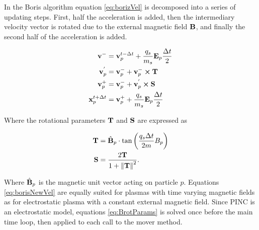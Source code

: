 In the Boris algorithm equation \eqref{eq:borizVel} is decomposed into a series of updating steps. First, half the acceleration is added, then the intermediary velocity vector is rotated due to the external magnetic field $\vb{B}$, and finally the second half of the acceleration is added.

\begin{subequations}\label{eq:borisNewVel}
    \begin{align}
        \vb{v}^{-} &= \vb{v}^{t-\Delta t}_p + \frac{q_s}{m_s} \vb{E}_p \frac{\Delta t}{2} \\
        \vb{v}^{'}_p &= \vb{v}^{-}_p + \vb{v}^{-}_p \cross \vb{T} \\
        \vb{v}^{+}_p &= \vb{v}^{-}_p + \vb{v}^{'}_p \cross \vb{S} \\
        \vb{x}^{t+\Delta t}_p &= \vb{v}^{+}_p + \frac{q_s}{m_s} \vb{E}_p \frac{\Delta t}{2} 
    \end{align}
\end{subequations}

Where the rotational parameters $\vb{T}$ and $\vb{S}$ are expressed as

\begin{subequations}\label{eq:BrotParams}
    \begin{align}
        \vb{T} &= \hat{\vb{B}}_p \cdot \tan\left(\frac{q_s \Delta t}{2m} B_p \right) \\
        \vb{S} &= \frac{2 \vb{T}}{1 + \norm{\vb{T}}^2}. 
    \end{align}
\end{subequations}

Where $\hat{\vb{B}}_p$ is the magnetic unit vector acting on particle $p$. Equations \eqref{eq:borisNewVel} are equally suited for plasmas with time varying magnetic fields as for electrostatic plasma with a constant external magnetic field. Since PINC is an electrostatic model, equations \eqref{eq:BrotParams} is solved once before the main time loop, then applied to each call to the mover method.

